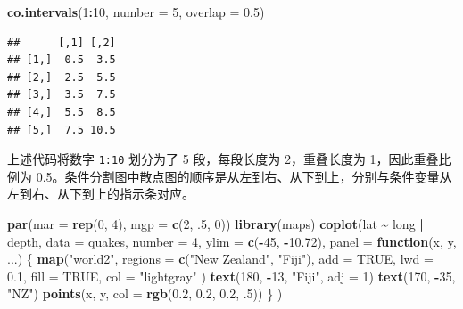\documentclass[
  b5paper,
  UTF8,twoside]{book}
\newenvironment{Shaded}{\begin{snugshade}}{\end{snugshade}}
\newcommand{\AttributeTok}[1]{\textcolor[rgb]{0.13,0.29,0.53}{#1}}
\newcommand{\ConstantTok}[1]{\textcolor[rgb]{0.56,0.35,0.01}{#1}}
\newcommand{\ControlFlowTok}[1]{\textcolor[rgb]{0.13,0.29,0.53}{\textbf{#1}}}
\newcommand{\DecValTok}[1]{\textcolor[rgb]{0.00,0.00,0.81}{#1}}
\newcommand{\FloatTok}[1]{\textcolor[rgb]{0.00,0.00,0.81}{#1}}
\newcommand{\FunctionTok}[1]{\textcolor[rgb]{0.13,0.29,0.53}{\textbf{#1}}}
\newcommand{\NormalTok}[1]{#1}
\newcommand{\SpecialCharTok}[1]{\textcolor[rgb]{0.81,0.36,0.00}{\textbf{#1}}}
\newcommand{\StringTok}[1]{\textcolor[rgb]{0.31,0.60,0.02}{#1}}
\begin{document}
\begin{Shaded}
\begin{Highlighting}[]
\FunctionTok{co.intervals}\NormalTok{(}\DecValTok{1}\SpecialCharTok{:}\DecValTok{10}\NormalTok{, }\AttributeTok{number =} \DecValTok{5}\NormalTok{, }\AttributeTok{overlap =} \FloatTok{0.5}\NormalTok{)}
\end{Highlighting}
\end{Shaded}

\begin{verbatim}
##      [,1] [,2]
## [1,]  0.5  3.5
## [2,]  2.5  5.5
## [3,]  3.5  7.5
## [4,]  5.5  8.5
## [5,]  7.5 10.5
\end{verbatim}

上述代码将数字 \texttt{1:10} 划分为了 5 段，每段长度为 2，重叠长度为 1，因此重叠比例为 0.5。条件分割图中散点图的顺序是从左到右、从下到上，分别与条件变量从左到右、从下到上的指示条对应。





\begin{Shaded}
\begin{Highlighting}[]
\FunctionTok{par}\NormalTok{(}\AttributeTok{mar =} \FunctionTok{rep}\NormalTok{(}\DecValTok{0}\NormalTok{, }\DecValTok{4}\NormalTok{), }\AttributeTok{mgp =} \FunctionTok{c}\NormalTok{(}\DecValTok{2}\NormalTok{, .}\DecValTok{5}\NormalTok{, }\DecValTok{0}\NormalTok{))}
\FunctionTok{library}\NormalTok{(maps)}
\FunctionTok{coplot}\NormalTok{(lat }\SpecialCharTok{\textasciitilde{}}\NormalTok{ long }\SpecialCharTok{|}\NormalTok{ depth,}
  \AttributeTok{data =}\NormalTok{ quakes, }\AttributeTok{number =} \DecValTok{4}\NormalTok{,}
  \AttributeTok{ylim =} \FunctionTok{c}\NormalTok{(}\SpecialCharTok{{-}}\DecValTok{45}\NormalTok{, }\SpecialCharTok{{-}}\FloatTok{10.72}\NormalTok{), }\AttributeTok{panel =} \ControlFlowTok{function}\NormalTok{(x, y, ...) \{}
    \FunctionTok{map}\NormalTok{(}\StringTok{"world2"}\NormalTok{,}
      \AttributeTok{regions =} \FunctionTok{c}\NormalTok{(}\StringTok{"New Zealand"}\NormalTok{, }\StringTok{"Fiji"}\NormalTok{),}
      \AttributeTok{add =} \ConstantTok{TRUE}\NormalTok{, }\AttributeTok{lwd =} \FloatTok{0.1}\NormalTok{, }\AttributeTok{fill =} \ConstantTok{TRUE}\NormalTok{, }\AttributeTok{col =} \StringTok{"lightgray"}
\NormalTok{    )}
    \FunctionTok{text}\NormalTok{(}\DecValTok{180}\NormalTok{, }\SpecialCharTok{{-}}\DecValTok{13}\NormalTok{, }\StringTok{"Fiji"}\NormalTok{, }\AttributeTok{adj =} \DecValTok{1}\NormalTok{)}
    \FunctionTok{text}\NormalTok{(}\DecValTok{170}\NormalTok{, }\SpecialCharTok{{-}}\DecValTok{35}\NormalTok{, }\StringTok{"NZ"}\NormalTok{)}
    \FunctionTok{points}\NormalTok{(x, y, }\AttributeTok{col =} \FunctionTok{rgb}\NormalTok{(}\FloatTok{0.2}\NormalTok{, }\FloatTok{0.2}\NormalTok{, }\FloatTok{0.2}\NormalTok{, .}\DecValTok{5}\NormalTok{))}
\NormalTok{  \}}
\NormalTok{)}
\end{Highlighting}
\end{Shaded}
\end{document}
